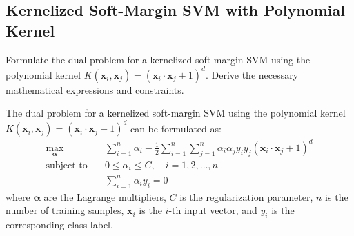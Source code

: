 \subsection{Kernelized Soft-Margin SVM with Polynomial Kernel}
Formulate the dual problem for a kernelized soft-margin SVM using the polynomial kernel $K(\mathbf{x}_i, \mathbf{x}_j) = (\mathbf{x}_i \cdot \mathbf{x}_j + 1)^d$. Derive the necessary mathematical expressions and constraints.
\begin{qsolve}
    \begin{qsolve}[]
        The dual problem for a kernelized soft-margin SVM using the polynomial kernel $K(\mathbf{x}_i, \mathbf{x}_j) = (\mathbf{x}_i \cdot \mathbf{x}_j + 1)^d$ can be formulated as:
        \begin{align*}
            \max_{\boldsymbol{\alpha}} & \quad \sum_{i=1}^{n} \alpha_i - \frac{1}{2} \sum_{i=1}^{n} \sum_{j=1}^{n} \alpha_i \alpha_j y_i y_j (\mathbf{x}_i \cdot \mathbf{x}_j + 1)^d \\
            \text{subject to} & \quad 0 \leq \alpha_i \leq C, \quad i = 1, 2, \ldots, n \\
            & \quad \sum_{i=1}^{n} \alpha_i y_i = 0
        \end{align*}
        where $\boldsymbol{\alpha}$ are the Lagrange multipliers, $C$ is the regularization parameter, $n$ is the number of training samples, $\mathbf{x}_i$ is the $i$-th input vector, and $y_i$ is the corresponding class label.

    \end{qsolve}
\end{qsolve}
